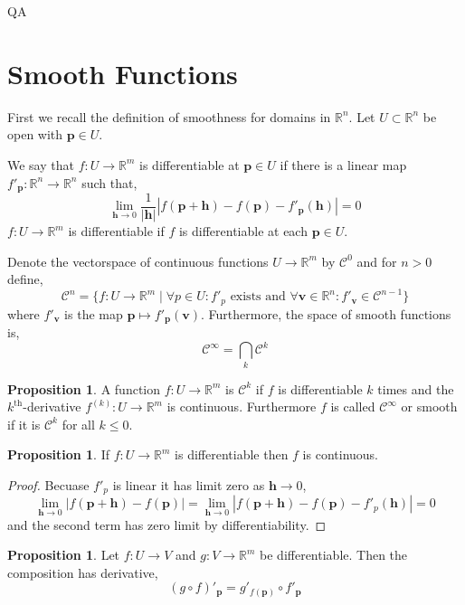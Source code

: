 QA	 \documentclass[12pt]{extarticle}
\newcommand{\R}{\mathbb{R}}
\theoremstyle{definition}
\newtheorem{proposition}[theorem]{Proposition}
\newenvironment{definition}[1][Definition:]{\begin{trivlist}
\item[\hskip \labelsep {\bfseries #1}]}{\end{trivlist}}
\renewcommand{\bf}[1]{\mathbf{#1}}
\newcommand{\C}[1]{\mathcal{C}^{#1}}
\begin{document}
\section{Smooth Functions}

First we recall the definition of smoothness for domains in $\R^n$. Let $U \subset \R^n$ be open with $\bf{p} \in U$.

\begin{definition}
We say that $f : U \to \R^m$ is differentiable at $\bf{p} \in U$ if there is a linear map $f'_{\bf{p}} : \R^n \to \R^n$ such that,
\[ \lim_{\bf{h} \to 0} \frac{1}{|\bf{h}|} \left| f(\bf{p} + \bf{h}) - f(\bf{p}) - f'_{\bf{p}} (\bf{h})  \right| = 0 \] 
$f : U \to \R^m$ is differentiable if $f$ is differentiable at each $\bf{p} \in U$.
\end{definition}

\begin{definition}
Denote the vectorspace of continuous functions $U \to \R^m$ by $\C{0}$ and for $n > 0$ define, 
\[ \C{n} = \{ f : U \to \R^m \mid \forall p \in U : f'_p \text{ exists and } \forall \bf{v} \in \R^n : f'_\bf{v} \in \C{n-1} \} \] 
where $f'_\bf{v}$ is the map $\bf{p} \mapsto f'_{\bf{p}}(\bf{v})$. Furthermore, the space of smooth functions is,
\[ \C{\infty} = \bigcap_{k} \C{k} \] 
\end{definition}

\begin{proposition}
A function $f : U \to \R^m$ is $\C{k}$ if $f$ is differentiable $k$ times and the $k^{\mathrm{th}}$-derivative $f^{(k)} : U \to \R^m$ is continuous. Furthermore $f$ is called $\C{\infty}$ or smooth if it is $\C{k}$ for all $k \le 0$.
\end{proposition}

\begin{proposition}
If $f : U \to \R^m$ is differentiable then $f$ is continuous. 
\end{proposition}

\begin{proof}
Becuase $f'_p$ is linear it has limit zero as $\bf{h} \to 0$,
\[ \lim_{\bf{h} \to 0} | f(\bf{p} + \bf{h}) - f(\bf{p})| = \lim_{\bf{h} \to 0} \left| f(\bf{p} + \bf{h}) - f(\bf{p}) - f'_p(\bf{h})  \right| = 0 \]
and the second term has zero limit by differentiability.
\end{proof}

\begin{proposition}
Let $f : U \to V$ and $g : V \to \R^m$ be differentiable. Then the composition has derivative, 
\[ (g \circ f)'_{\bf{p}} = g'_{f(\bf{p})} \circ f'_{\bf{p}} \]
\end{proposition}
\end{document}
